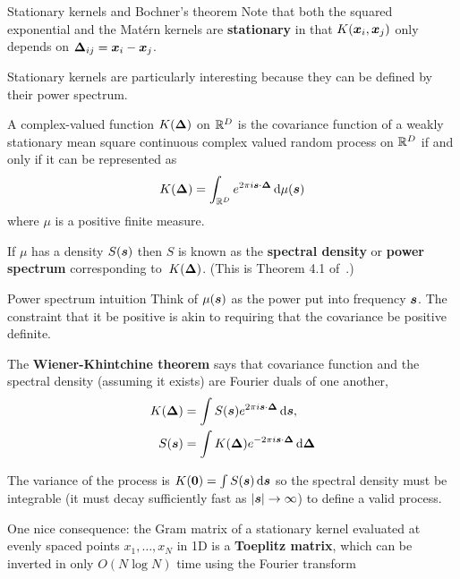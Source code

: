 \documentclass[aspectratio=169]{beamer}
\begin{document}
\begin{frame}{Stationary kernels and Bochner's theorem}
Note that both the squared exponential and the Mat\'{e}rn kernels are \textbf{stationary} in that $K(\boldsymbol{x}_i, \boldsymbol{x}_j)$ only depends on $\boldsymbol{\Delta}_{ij} = \boldsymbol{x}_i - \boldsymbol{x}_j$.

Stationary kernels are particularly interesting because they can be defined by their power spectrum.

\begin{theorem}
A complex-valued function $K(\boldsymbol{\Delta})$ on $\mathbb{R}^D$ is the covariance function of a weakly stationary mean square continuous complex valued random process on $\mathbb{R}^D$ if and only if it can be represented as 
\begin{align}
    K(\boldsymbol{\Delta}) = \int_{\mathbb{R}^D} e^{2 \pi i \boldsymbol{s}\cdot \boldsymbol{\Delta}} \mathop{}\!\mathrm{d} \mu(\boldsymbol{s})
\end{align}
where $\mu$ is a positive finite measure.
\end{theorem}
If $\mu$ has a density $S(\boldsymbol{s})$ then $S$ is known as the \textbf{spectral density} or \textbf{power spectrum} corresponding to~$K(\boldsymbol{\Delta})$. (This is Theorem 4.1 of~\citet{williams1996gaussian}.)

\end{frame}

\begin{frame}{Power spectrum intuition}
Think of $\mu(\boldsymbol{s})$ as the power put into frequency $\boldsymbol{s}$. The constraint that it be positive is akin to requiring that the covariance be positive definite.

The \textbf{Wiener-Khintchine theorem} says that covariance function and the spectral density (assuming it exists) are Fourier duals of one another,
\begin{align}
    K(\boldsymbol{\Delta}) &= \int S(\boldsymbol{s}) e^{2 \pi i \boldsymbol{s} \cdot \boldsymbol{\Delta}} \mathop{}\!\mathrm{d} \boldsymbol{s}, \\
    S(\boldsymbol{s}) &= \int K(\boldsymbol{\Delta}) e^{-2 \pi i \boldsymbol{s} \cdot \boldsymbol{\Delta}} \mathop{}\!\mathrm{d} \boldsymbol{\Delta}
\end{align}

The variance of the process is $K(\boldsymbol{0}) = \int S(\boldsymbol{s}) \mathop{}\!\mathrm{d} \boldsymbol{s}$ so the spectral density must be integrable (it must decay sufficiently fast as $|\boldsymbol{s}| \to \infty$) to define a valid process.

One nice consequence: the Gram matrix of a stationary kernel evaluated at evenly spaced points $x_1, \ldots, x_N$ in 1D is a \textbf{Toeplitz matrix}, which can be inverted in only $O(N \log N)$ time using the Fourier transform~\citep{Storkey1999-wq,Cunningham2008-zj}
\end{frame}
\end{document}
